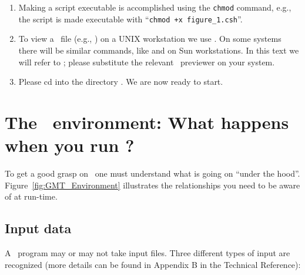 \documentclass{report}
\begin{document}
\begin{enumerate}
\item Making a script executable is accomplished using the \texttt{chmod}
command, e.g., the script  is made executable
with ``\texttt{chmod +x figure\_1.csh}''.

\item To view a \PS\ file (e.g., ) on a UNIX workstation
we use  .  On some systems there
will be similar commands, like  and 
on Sun workstations.  In this text we will refer to
; please substitute the relevant \PS\ previewer
on your system.

\item Please cd into the directory .  We are
now ready to start.

\end{enumerate}

\section{The \gmt\ environment: What happens when you run \gmt ?}

To get a good grasp on \GMT\ one must understand what is going on ``under
the hood''.  Figure~\ref{fig:GMT_Environment} illustrates the relationships
you need to be aware of at run-time.


\subsection{Input data}
A \GMT\ program may or may not take input files.  Three different
types of input are recognized (more details can be found in Appendix
B in the Technical Reference):
\end{document}
